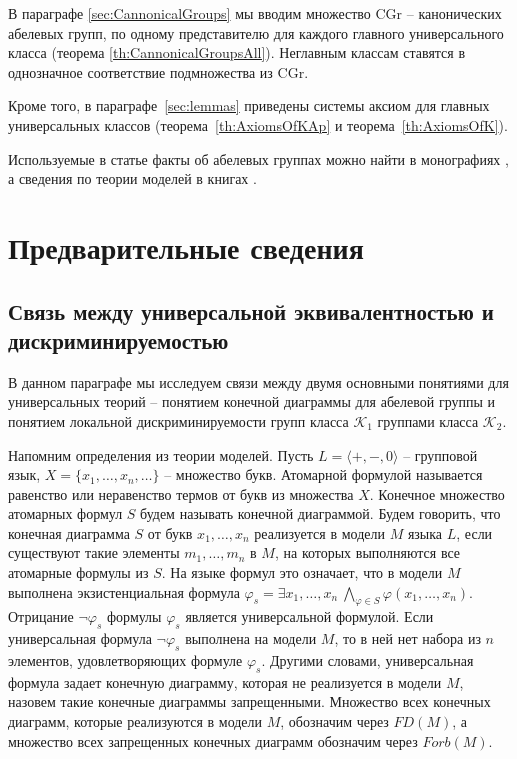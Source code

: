 \documentclass[a4paper,11pt,twoside]{article}
\def\K{{\mathcal{K}}}
\def\CG{{\mathrm{CGr}}}
\begin{document}
В параграфе \ref{sec:CannonicalGroups} мы вводим множество $\CG$ -- канонических абелевых групп, по одному представителю для каждого главного универсального класса (теорема \ref{th:CannonicalGroupsAll}). Неглавным классам ставятся в однозначное соответствие подмножества из $\CG$.

Кроме того, в параграфе~\ref{sec:lemmas} приведены системы аксиом для главных универсальных классов (теорема~\ref{th:AxiomsOfKAp} и теорема~\ref{th:AxiomsOfK}).

Используемые в статье факты об абелевых группах можно найти в монографиях \cite{Fuchs1, Fuchs2}, а сведения по теории моделей в книгах \cite{Ershov, Hodges, DM}.


\section{Предварительные сведения}

\subsection{Связь между универсальной эквивалентностью и дискриминируемостью}

В данном параграфе мы исследуем связи между двумя основными понятиями для универсальных теорий -- понятием конечной диаграммы для абелевой группы и понятием локальной дискриминируемости групп класса $\K_1$ группами класса $\K_2$.

Напомним определения из теории моделей. Пусть $L = \langle +, -, 0\rangle$ -- групповой язык, $X = \{x_1, \ldots, x_n, \ldots\}$ -- множество букв. Атомарной формулой называется равенство или неравенство термов от букв из множества $X$. Конечное множество атомарных формул $S$ будем называть конечной диаграммой. Будем говорить, что конечная диаграмма $S$ от букв $x_1, \ldots, x_n$ реализуется в модели $M$ языка $L$, если существуют такие элементы $m_1, \ldots, m_n$ в $M$, на которых выполняются все атомарные формулы из $S$. На языке формул это означает, что в модели $M$ выполнена экзистенциальная формула $\varphi_s = \exists x_1, \ldots, x_n \ \bigwedge\limits_{\varphi \in S} \varphi(x_1, \ldots, x_n)$. Отрицание $\neg\varphi_s$ формулы $\varphi_s$ является универсальной формулой. Если универсальная формула $\neg\varphi_s$ выполнена на модели $M$, то в ней нет набора из $n$ элементов, удовлетворяющих формуле $\varphi_s$. 
Другими словами, универсальная формула задает конечную диаграмму, которая не реализуется в модели $M$, назовем такие конечные диаграммы запрещенными. Множество всех конечных диаграмм, которые реализуются в модели $M$, обозначим через $FD(M)$, а множество всех запрещенных конечных диаграмм обозначим через $Forb(M)$.
\end{document}
